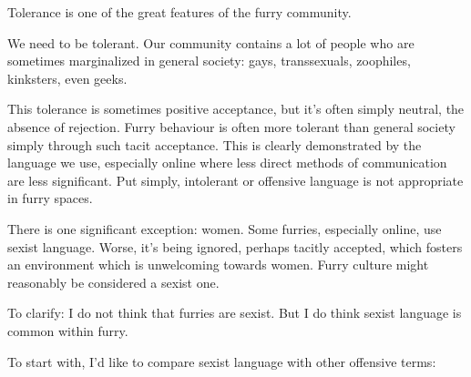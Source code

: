 
Tolerance is one of the great features of the furry community.

We need to be tolerant. Our community contains a lot of people who are sometimes marginalized in general society: gays, transsexuals, zoophiles, kinksters, even geeks.

This tolerance is sometimes positive acceptance, but it's often simply neutral, the absence of rejection. Furry behaviour is often more tolerant than general society simply through such tacit acceptance. This is clearly demonstrated by the language we use, especially online where less direct methods of communication are less significant. Put simply, intolerant or offensive language is not appropriate in furry spaces.

There is one significant exception: women. Some furries, especially online, use sexist language. Worse, it's being ignored, perhaps tacitly accepted, which fosters an environment which is unwelcoming towards women. Furry culture might reasonably be considered a sexist one.

To clarify: I do not think that furries are sexist. But I do think sexist language is common within furry.

To start with, I'd like to compare sexist language with other offensive terms:

